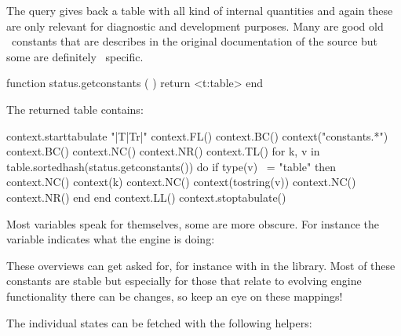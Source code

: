 The  query gives back a table with all kind of internal
quantities and again these are only relevant for diagnostic and development
purposes. Many are good old \TEX\ constants that are describes in the original
documentation of the source but some are definitely \LUAMETATEX\ specific.

\starttyping[option=LUA]
function status.getconstants ( )
    return <t:table>
end
\stoptyping

The returned table contains:

\startluacode
    context.starttabulate { "|T|Tr|" }
        context.FL()
        context.BC() context("constants.*")
        context.BC()
        context.NC() context.NR()
        context.TL()
        for k, v in table.sortedhash(status.getconstants()) do
            if type(v) ~= "table" then
                context.NC() context(k)
                context.NC() context(tostring(v))
                context.NC() context.NR()
            end
        end
        context.LL()
    context.stoptabulate()
\stopluacode

Most variables speak for themselves, some are more obscure. For instance the
 variable indicates what the engine is doing:


These overviews can get asked for, for instance with  in
the  library. Most of these constants are stable but especially for
those that relate to evolving engine functionality there can be changes, so keep
an eye on these mappings!

The individual states can be fetched with the following helpers:

